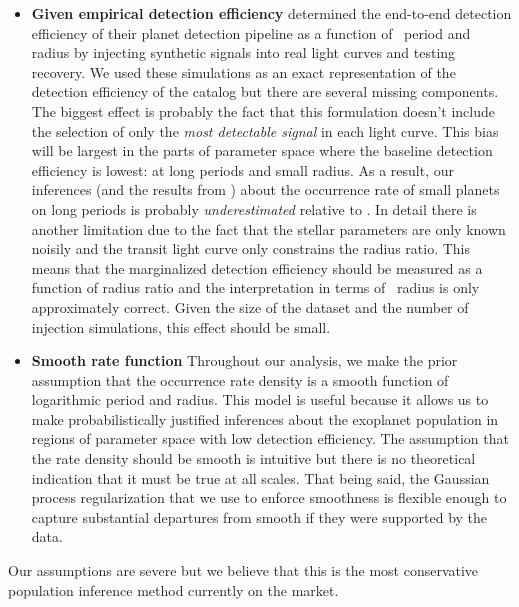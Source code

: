 \begin{itemize}
\item {\bf Given empirical detection efficiency}\quad
\citet{Petigura:2013} determined the end-to-end detection efficiency of their
planet detection pipeline as a function of \True\ period and radius by
injecting synthetic signals into real light curves and testing recovery.
We used these simulations as an exact representation of the detection
efficiency of the catalog but there are several missing components.
The biggest effect is probably the fact that this formulation doesn't include
the selection of only the \emph{most detectable signal} in each light curve.
This bias will be largest in the parts of parameter space where the baseline
detection efficiency is lowest: at long periods and small radius.
As a result, our inferences (and the results from \citealt{Petigura:2013}) about
the occurrence rate of small planets on long periods is probably
\emph{underestimated} relative to \Truth.
In detail there is another limitation due to the fact that the stellar
parameters are only known noisily and the transit light curve only constrains
the radius ratio.
This means that the marginalized detection efficiency should be measured as a
function of radius ratio and the interpretation in terms of \True\ radius is
only approximately correct.
Given the size of the dataset and the number of injection simulations, this
effect should be small.

\item {\bf Smooth rate function}\quad
Throughout our analysis, we make the prior assumption that the occurrence rate
density is a smooth function of logarithmic period and radius.
This model is useful because it allows us to make probabilistically justified
inferences about the exoplanet population in regions of parameter space with
low detection efficiency.
The assumption that the rate density should be smooth is intuitive but there
is no theoretical indication that it must be true at all scales.
That being said, the Gaussian process regularization that we use to enforce
smoothness is flexible enough to capture substantial departures from smooth if
they were supported by the data.

\end{itemize}
Our assumptions are severe but we believe that this is the most conservative
population inference method currently on the market.

